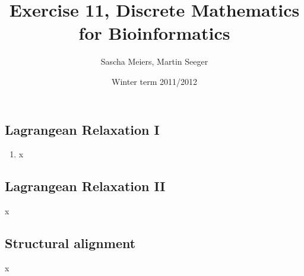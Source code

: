 \documentclass[a4paper, oneside]{scrartcl}
\author{Sascha Meiers, Martin Seeger}
\title{Exercise 11, Discrete Mathematics for Bioinformatics}
\date{Winter term 2011/2012}
\begin{document}
\maketitle


\subsection{Lagrangean Relaxation I}

\renewcommand{\labelenumi}{\alph{enumi})}
\begin{enumerate}
  \item x
\end{enumerate}

\subsection{Lagrangean Relaxation II}

x

\subsection{Structural alignment}

x
\end{document}

